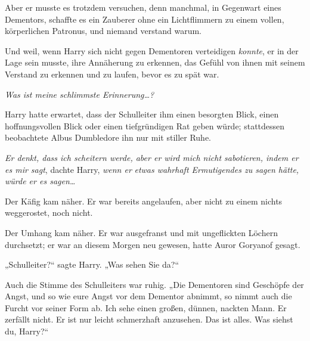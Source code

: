 Aber er musste es trotzdem versuchen, denn manchmal, in Gegenwart eines Dementors, schaffte es ein Zauberer ohne ein Lichtflimmern zu einem vollen, körperlichen Patronus, und niemand verstand warum.

Und weil, wenn Harry sich nicht gegen Dementoren verteidigen \emph{konnte}, er in der Lage sein musste, ihre Annäherung zu erkennen, das Gefühl von ihnen mit seinem Verstand zu erkennen und zu laufen, bevor es zu spät war.

\emph{Was ist meine schlimmste Erinnerung…?}

Harry hatte erwartet, dass der Schulleiter ihm einen besorgten Blick, einen hoffnungsvollen Blick oder einen tiefgründigen Rat geben würde; stattdessen beobachtete Albus Dumbledore ihn nur mit stiller Ruhe.

\emph{Er denkt, dass ich scheitern werde, aber er wird mich nicht sabotieren, indem er es mir sagt}, dachte Harry, \emph{wenn er} \emph{etwas wahrhaft Ermutigendes zu sagen hätte, würde er es sagen…}

Der Käfig kam näher. Er war bereits angelaufen, aber nicht zu einem nichts weggerostet, noch nicht.

Der Umhang kam näher. Er war ausgefranst und mit ungeflickten Löchern durchsetzt; er war an diesem Morgen neu gewesen, hatte Auror Goryanof gesagt.

„Schulleiter?“ sagte Harry. „Was sehen Sie da?“

Auch die Stimme des Schulleiters war ruhig. „Die Dementoren sind Geschöpfe der Angst, und so wie eure Angst vor dem Dementor abnimmt, so nimmt auch die Furcht vor seiner Form ab. Ich sehe einen großen, dünnen, nackten Mann. Er zerfällt nicht. Er ist nur leicht schmerzhaft anzusehen. Das ist alles. Was siehst du, Harry?“

